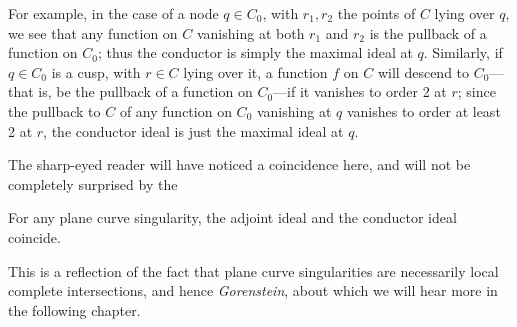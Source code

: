 For example, in the case of a node $q \in C_0$, with $r_1,r_2$ the points of $C$ lying over $q$, we see that any function on $C$ vanishing at both $r_1$ and $r_2$ is the pullback of a function on $C_0$; thus the conductor is simply the maximal ideal at $q$. Similarly, if $q \in C_0$ is a cusp, with $r \in C$ lying over it, a function $f$ on $C$ will descend to $C_0$---that is, be the pullback of a function on $C_0$---if it vanishes to order 2 at $r$; since the pullback to $C$ of any function on $C_0$ vanishing at $q$ vanishes to order at least 2 at $r$, the conductor ideal is just the maximal ideal at $q$.

The sharp-eyed reader will have noticed a coincidence here, and will not be completely surprised by the

\begin{theorem}
For any plane curve singularity, the adjoint ideal and the conductor ideal coincide.
\end{theorem}

This is a reflection of the fact that plane curve singularities are necessarily local complete intersections, and hence \emph{Gorenstein}, about which we will hear more in the following chapter.

